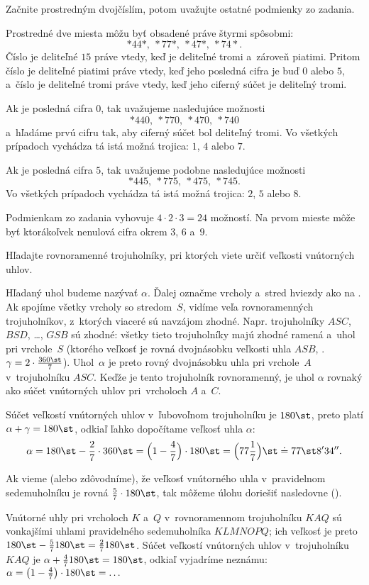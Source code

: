 {%
\napad
Začnite prostredným dvojčíslím, potom uvažujte ostatné
podmienky zo zadania.

\riesenie
Prostredné dve miesta môžu byť obsadené práve štyrmi spôsobmi:
$$
*44*,\ *77*,\ *47*,\ *74*.
$$
Číslo je deliteľné $15$ práve vtedy, keď je deliteľné tromi a~zároveň piatimi.
Pritom číslo je deliteľné piatimi práve vtedy, keď jeho posledná cifra je buď
$0$ alebo $5$,
a~číslo je deliteľné tromi práve vtedy, keď jeho ciferný súčet je deliteľný
tromi.

Ak je posledná cifra $0$, tak uvažujeme nasledujúce možnosti
$$
*440,\ *770,\ *470,\ *740
$$
a~hľadáme prvú cifru tak, aby ciferný súčet bol deliteľný tromi.
Vo všetkých prípadoch vychádza tá istá možná trojica: $1$, $4$ alebo $7$.

Ak je posledná cifra $5$, tak uvažujeme podobne nasledujúce možnosti
$$
*445,\ *775,\ *475,\ *745.
$$
Vo všetkých prípadoch vychádza tá istá možná trojica: $2$, $5$ alebo $8$.

Podmienkam zo zadania vyhovuje $4\cdot2\cdot3=24$ možností.
Na prvom mieste môže byť ktorákoľvek nenulová cifra okrem $3$, $6$ a~$9$.}

{%
\napad
Hľadajte rovnoramenné trojuholníky, pri ktorých viete určiť veľkosti
vnútorných uhlov.

\res
Hľadaný uhol budeme nazývať $\alpha$.
Ďalej označme vrcholy a~stred hviezdy ako na \obr.
Ak spojíme všetky vrcholy so stredom~$S$, vidíme veľa rovnoramenných
trojuholníkov, z~ktorých viaceré sú navzájom zhodné.
Napr. trojuholníky $ASC$, $BSD$, \dots, $GSB$ sú zhodné:
všetky tieto trojuholníky majú zhodné ramená a~uhol pri vrchole~$S$
(ktorého veľkosť je rovná dvojnásobku veľkosti uhla $ASB$, \tj.
$\gamma=2\cdot\frac{360\st}7$).
Uhol~$\alpha$ je preto rovný dvojnásobku uhla pri vrchole~$A$ v~trojuholníku $ASC$.
Keďže je tento trojuholník rovnoramenný, je uhol $\alpha$
rovnaký ako súčet vnútorných uhlov pri~vrcholoch $A$ a~$C$.

Súčet veľkostí vnútorných uhlov v~ľubovoľnom trojuholníku je $180\st$,
preto platí $\alpha+\gamma=180\st$, odkiaľ ľahko dopočítame
veľkosť uhla $\alpha$:
$$
\alpha=180\st-\frac27\cdot 360\st
=\Bigl(1-\frac47\Bigr)\cdot 180\st
=\Bigl(77\frac17\Bigr)\st
\doteq 77\st 8' 34''.
$$

\poznamka
Ak vieme (alebo zdôvodníme), že veľkosť vnútorného uhla v~pravidelnom
sedemuholníku je rovná $\frac57\cdot180\st$, tak môžeme úlohu doriešiť nasledovne (\obr).

Vnútorné uhly pri vrcholoch $K$ a~$Q$ v~rovnoramennom trojuholníku $KAQ$ sú
vonkajšími uhlami pravidelného sedemuholníka $KLMNOPQ$; ich veľkosť je preto
$180\st-\frac57180\st=\frac27180\st$.
Súčet veľkostí vnútorných uhlov v~trojuholníku $KAQ$ je
$\alpha+\frac47180\st=180\st$, odkiaľ vyjadríme neznámu:
$\alpha=\left(1-\frac47\right)\cdot 180\st=\dots $}

